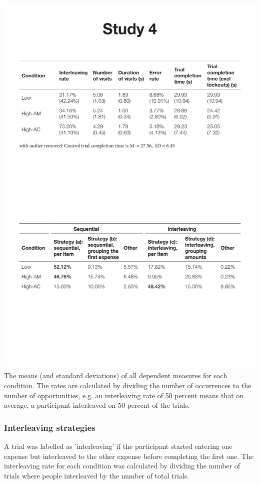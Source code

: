 \begin{table}
 \includegraphics[width=\textwidth]{images/ch34/ch34-4_means.pdf}
\caption[Study 4 means and SDs of dependent measures]{The means (and standard deviations) of all dependent measures for each condition. The rates are calculated by dividing the number of occurrences to the number of opportunities, e.g. an interleaving rate of 50 percent means that on average, a participant interleaved on 50 percent of the trials.}
\label{tbl:ch34_4-means}
\end{table}

\subsubsection{Interleaving strategies}
A trial was labelled as 'interleaving' if the participant started entering one expense but interleaved to the other expense before completing the first one. The interleaving rate for each condition was calculated by dividing the number of trials where people interleaved by the number of total trials.  

